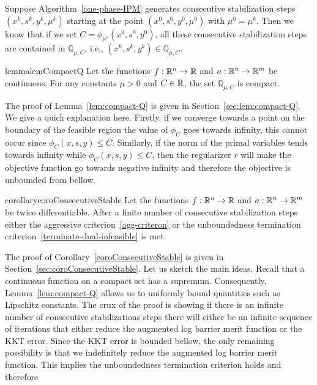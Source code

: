 \documentclass{article}
\begin{document}
Suppose Algorithm~\ref{one-phase-IPM} generates consecutive stabilization steps $(x^{k}, s^{k}, y^{k}, \mu^k)$ starting at the point $(x^{0}, s^{0}, y^{0},  \mu^{0})$ with $\mu^{0} = \mu^{k}$. Then we know that if we set $C = \phi_{\mu^{0}}(x^{0}, s^{0}, y^{0})$, all these consecutive stabilization steps are contained in $\mathbb{Q}_{\mu, C}$, i.e., $(x^{k}, s^{k}, y^{k}) \in \mathbb{Q}_{\mu, C}$. 


\begin{restatable}{lemma}{lemCompactQ}\label{lem:compact-Q}
Let the functions $f : \mathbb{R}^{n} \rightarrow \mathbb{R}$ and $a : \mathbb{R}^{n} \rightarrow \mathbb{R}^{m}$ be continuous. For any constants $\mu > 0$ and $C \in \mathbb{R}$, the set $\mathbb{Q}_{\mu, C}$ is compact.
\end{restatable}

The proof of Lemma~\ref{lem:compact-Q} is given in Section~\ref{sec:lem:compact-Q}. We give a quick explanation here. Firstly, if we converge towards a point on the boundary of the feasible region the value of $\phi_{C}$ goes towards infinity, this cannot occur since $\phi_{C}(x, s, y) \le C$. Similarly, if the norm of the primal variables tends towards infinity while $\phi_{C}(x, s, y) \le C$, then the regularizer $r$ will make the objective function go towards negative infinity and therefore the objective is unbounded from bellow.

\begin{restatable}{corollary}{coroConsecutiveStable}\label{coroConsecutiveStable}
Let the functions $f : \mathbb{R}^{n} \rightarrow \mathbb{R}$ and $a : \mathbb{R}^{n} \rightarrow \mathbb{R}^{m}$ be twice differentiable.
After a finite number of consecutive stabilization steps either the aggressive criterion~\eqref{agg-criteron} or the unboundedness termination criterion~\eqref{terminate-dual-infeasible}  is met.
\end{restatable}

The proof of Corollary~\ref{coroConsecutiveStable} is given in Section~\ref{sec:coroConsecutiveStable}. Let us sketch the main ideas. Recall that a continuous function on a compact set has a supremum. Consequently, Lemma~\ref{lem:compact-Q} allows us to uniformly bound quantities such as Lipschitz constants. The crux of the proof is showing if there is an infinite number of consecutive stabilizations steps there will either be an infinite sequence of iterations that either reduce the augmented log barrier merit function or the KKT error. Since the KKT error is bounded bellow, the only remaining possibility is that we indefinitely reduce the augmented log barrier merit function. This implies the unboundedness termination criterion holds and therefore 
\end{document}
